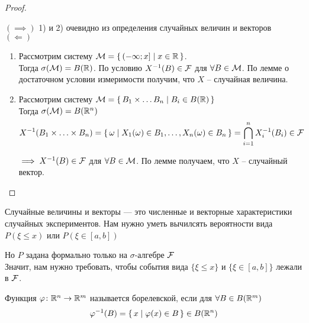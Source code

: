 \begin{proof}~

  $(\implies)$ 1) и 2) очевидно из определения случайных величин и векторов\\

  $(\Leftarrow)$ \nolinebreak
  \begin{enumerate}
    \item 
      Рассмотрим систему $\mathcal{M} = \left\{ \, (-\infty; x] \mid x \in \mathbb{R} \, \right\}$.\\
      Тогда  $\sigma(\mathcal{M}) = B(\mathbb{R})$. По условию $X^{-1} (B) \in \mathcal{F}$ для 
      $\forall B \in \mathcal{M}$. По лемме о достаточном условии измеримости получим, 
      что $X$ -- случайная величина.

    \item 
      Рассмотрим систему $\mathcal{M} = \left\{ \, B_1 \times \ldots B_n \mid B_i \in B(\mathbb{R}) \, \right\}$\\
      Тогда $\sigma(\mathcal{M}) = B(\mathbb{R}^n)$
      \begin{align*}
        &X^{-1} (B_1 \times \ldots \times B_n) = 
        \left\{ \, \omega \mid X_1(\omega) \in B_1, \ldots, X_n(\omega) \in B_n \, \right\}
        = \bigcap_{i = 1}^{n} X^{-1}_i (B_i) \in \mathcal{F}
      \end{align*}

      $\implies X^{-1} (B) \in \mathcal{F}$ для $\forall B \in \mathcal{M}$. По лемме получаем, 
      что $X$ -- случайный вектор.
  \end{enumerate}

\end{proof}


Случайные величины и векторы --- это численные и векторные характеристики случайных экспериментов. Нам нужно уметь вычилсять вероятности вида $P(\xi \leq x)$ или $P(\xi \in [a, b])$

Но $P$ задана формально только на $\sigma$-алгебре $\mathcal{F}$\\
Значит, нам нужно требовать, чтобы события вида $\{ \xi \leq x \}$ и 
$\{\xi \in [a, b]\}$ лежали в $\mathcal{F}$.


\begin{definition}
  Функция $\varphi\colon \mathbb{R}^n \to \mathbb{R}^m$ называется борелевской, 
  если для $\forall B \in B(\mathbb{R}^m)$
  \begin{align*}
    \varphi^{-1} (B) = \left\{ \, x \mid \varphi(x) \in B \, \right\} \in B(\mathbb{R}^n)
  \end{align*}
\end{definition}

